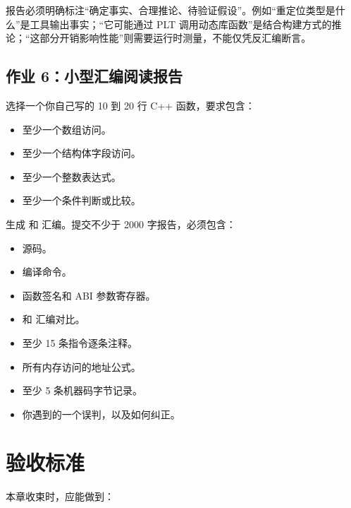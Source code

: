 \begin{exercisebox}
报告必须明确标注“确定事实、合理推论、待验证假设”。例如“重定位类型是什么”是工具输出事实；“它可能通过 PLT 调用动态库函数”是结合构建方式的推论；“这部分开销影响性能”则需要运行时测量，不能仅凭反汇编断言。

\subsection*{作业 6：小型汇编阅读报告}

选择一个你自己写的 10 到 20 行 C++ 函数，要求包含：

\begin{itemize}
  \item 至少一个数组访问。
  \item 至少一个结构体字段访问。
  \item 至少一个整数表达式。
  \item 至少一个条件判断或比较。
\end{itemize}

生成  和  汇编。提交不少于 2000 字报告，必须包含：

\begin{itemize}
  \item 源码。
  \item 编译命令。
  \item 函数签名和 ABI 参数寄存器。
  \item {} 和  汇编对比。
  \item 至少 15 条指令逐条注释。
  \item 所有内存访问的地址公式。
  \item 至少 5 条机器码字节记录。
  \item 你遇到的一个误判，以及如何纠正。
\end{itemize}
\end{exercisebox}

\section{验收标准}

本章收束时，应能做到：


